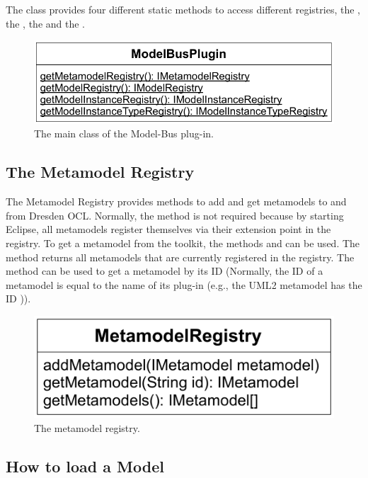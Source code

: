 The class provides four different static methods to access different
registries, the , the , the 
 and the .

\begin{figure}[!b]
	\centering
	\includegraphics[width=.8\linewidth]{figures/integration/modelBusPlugin}
	\caption{The main class of the Model-Bus plug-in.}
	\label{pic:integration:modelBusPlugin}
\end{figure}


\subsection{The Metamodel Registry}

The Metamodel Registry provides methods to add and get metamodels to and from 
Dresden OCL. Normally, the method  is not required
because by starting Eclipse, all metamodels register themselves via their 
extension point in the registry. To get a metamodel from the toolkit, the
methods  and  can be used. 
The method  returns all metamodels that are currently 
registered in the registry. The method  can be 
used to get a metamodel by its ID (Normally, the ID of a metamodel is equal to
the name of its plug-in (e.g., the \acs{UML}2 metamodel has the ID 
)).

\begin{figure}[!b]
	\centering
	\includegraphics[width=.55\linewidth]{figures/integration/metaModelRegistry}
	\caption{The metamodel registry.}
	\label{pic:integration:metaModelRegistry}
\end{figure}


\subsection{How to load a Model}

